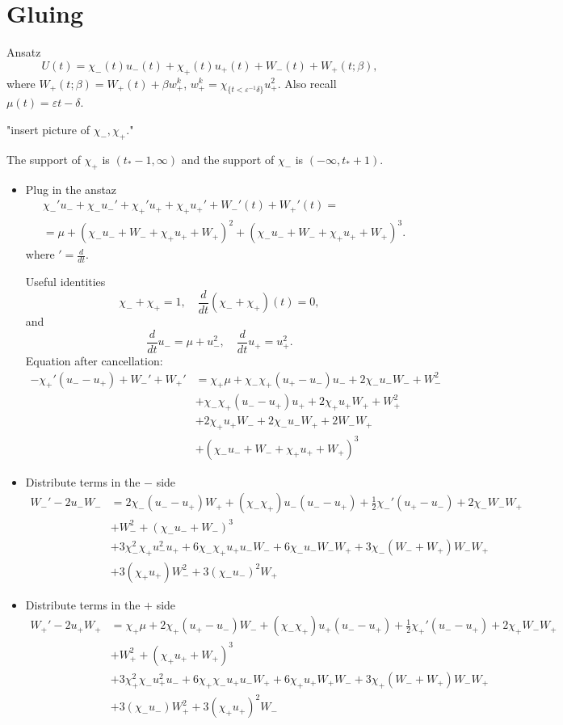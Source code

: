 \documentclass[letterpaper,11pt]{article}
\newcommand{\eps}{\varepsilon}
\numberwithin{equation}{section}
\theoremstyle{plain}
\begin{document}
\section{Gluing}
Ansatz
\[
U(t) = \chi_-(t)u_-(t) + \chi_+(t)u_+(t) + W_-(t)+W_+(t;\beta),
\]
where $W_+(t;\beta) = W_+(t) + \beta w_{+}^k$, $w_+^k = \chi_{\{t<\eps^{-1}\delta\}}u_+^2$. Also recall $\mu(t) = \eps t- \delta$.

"insert picture of $\chi_-,\chi_+$."

The support of $\chi_+$ is $(t_*-1,\infty)$ and  the support of $\chi_-$ is $(-\infty, t_*+1)$.

\begin{itemize}
\item 
Plug in the anstaz
\begin{align*}
&\chi_-' u_- + \chi_- u_-' + \chi_+' u_+ + \chi_+ u_+' +W_-'(t)+W_+'(t) = \\
&=\mu +(\chi_-u_-+W_-+\chi_+u_+ +W_+)^2 +(\chi_-u_-+W_-+\chi_+u_+ +W_+)^3.
\end{align*}
where $' = \frac{d}{dt}$.

Useful identities 
\[
\chi_-+\chi_+ = 1, \quad \frac{d}{dt}(\chi_-+\chi_+)(t) = 0,
\]
and
\[ 
 \frac{d}{dt} u_- = \mu+ u_-^2, \quad \frac{d}{dt} u_+ = u_+^2.
 \]
Equation after cancellation:
\begin{align*}
-\chi_+'(u_- -u_+) +W_-'+W_+' &= \chi_+\mu +\chi_-\chi_+(u_+ - u_-)u_- +2\chi_- u_- W_- +W_-^2 \\
&+\chi_-\chi_+(u_- -u_+)u_+ + 2\chi_+ u_+W_+ + W_+^2 \\
&+ 2\chi_+ u_+ W_- + 2\chi_- u_- W_+ + 2W_-W_+\\
&+ (\chi_-u_-+W_- + \chi_+u_+ +W_+)^3
\end{align*}

\item Distribute terms in the $-$ side 
\begin{align*}
W_-' -2u_-W_- &=  2\chi_-(u_- -u_+)W_+ + (\chi_-\chi_+) u_-(u_- -u_+)+\frac{1}{2}\chi_-'(u_+ -u_-) +2\chi_-W_-W_+\\
&+W_-^2+ (\chi_-u_- + W_-)^3\\
&+ 3\chi_-^2\chi_+ u_-^2 u_+  + 6\chi_-\chi_+ u_+ u_-W_- + 6\chi_- u_- W_- W_+ + 3\chi_-(W_-+W_+)W_-W_+ \\&+3(\chi_+u_+)W_-^2 + 3(\chi_-u_-)^2W_+
\end{align*}

\item Distribute terms in the $+$ side 
\begin{align*}
W_+'-2u_+W_+  &=  \chi_+\mu + 2\chi_+(u_+ -u_-)W_-+ (\chi_-\chi_+) u_+(u_- -u_+)+\frac{1}{2}\chi_+'(u_- -u_+) +2\chi_+W_-W_+\\
&+W_+^2+ (\chi_+u_+ + W_+)^3 \\
&+ 3\chi_+^2\chi_-u_+^2u_- + 6\chi_+\chi_- u_+u_- W_+ +6 \chi_+u_+W_+W_- +3\chi_+(W_-+W_+)W_-W_+\\
&+3(\chi_-u_-)W_+^2 + 3(\chi_+u_+)^2W_-
\end{align*}
\end{itemize}
\end{document}

